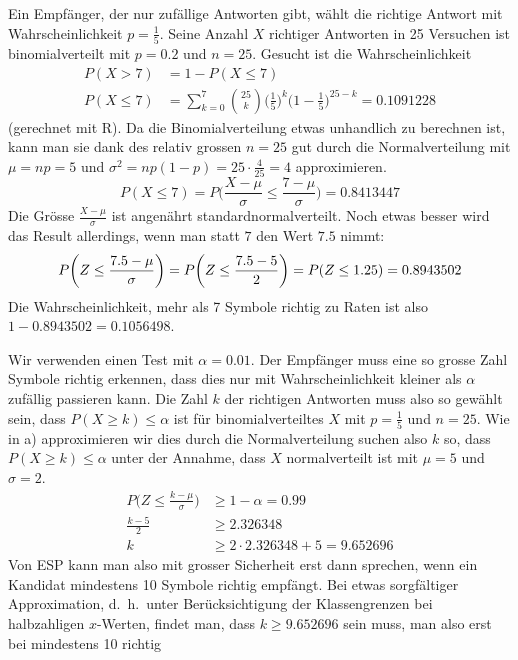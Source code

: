 \begin{loesung}
\begin{teilaufgaben}
\item Ein Empfänger, der nur zufällige Antworten gibt, wählt
die richtige Antwort mit Wahrscheinlichkeit $p=\frac15$.
Seine Anzahl $X$ richtiger Antworten in 25 Versuchen ist binomialverteilt mit
$p=0.2$ und $n=25$. Gesucht ist die Wahrscheinlichkeit
\begin{align*}
P(X > 7)&= 1 - P(X\le 7)\\
P(X\le 7)&=\sum_{k=0}^7\binom{25}{k}
\biggl(\frac15\biggr)^k
\biggl(1-\frac15\biggr)^{25-k}
 = 0.1091228
\end{align*}
(gerechnet mit R).
Da die Binomialverteilung etwas unhandlich zu berechnen ist, kann man sie
dank des relativ grossen $n=25$ gut durch die Normalverteilung
mit $\mu=np=5$ und $\sigma^2=np(1-p)=25\cdot\frac{4}{25}=4$
approximieren.
\[
P(X\le 7)=P\biggl(\frac{X-\mu}{\sigma}\le \frac{7-\mu}{\sigma}\biggr)
=
0.8413447
\]
Die Grösse $\frac{X-\mu}{\sigma}$ ist angenährt standardnormalverteilt.
Noch etwas besser wird das Result allerdings, wenn man statt $7$ den
Wert $7.5$ nimmt:
\[
P\biggl(Z\le\frac{7.5-\mu}{\sigma}\biggr)
=
P\biggl(Z\le \frac{7.5-5}{2}\biggr)
=
P(Z\le 1.25)=0.8943502\\
\]
Die Wahrscheinlichkeit, mehr als 7 Symbole richtig zu Raten ist
also $1-0.8943502= 0.1056498$.
\item
Wir verwenden einen Test mit $\alpha=0.01$.
Der Empfänger muss eine so grosse Zahl Symbole richtig erkennen,
dass dies nur mit Wahrscheinlichkeit kleiner als $\alpha$ zufällig
passieren kann.
Die Zahl $k$ der richtigen Antworten muss also so gewählt sein,
dass $P(X\ge k) \le \alpha$ ist für binomialverteiltes $X$ mit $p=\frac15$
und $n=25$. Wie in a) approximieren wir dies durch die Normalverteilung
suchen also $k$ so, dass $P(X\ge k)\le\alpha$ unter der Annahme, dass
$X$ normalverteilt ist mit $\mu=5$ und $\sigma=2$.
\begin{align*}
P\biggl(Z\le \frac{k - \mu}{\sigma}\biggr)&\ge 1-\alpha=0.99\\
\frac{k-5}2&\ge 2.326348\\
k&\ge 2\cdot 2.326348 + 5=9.652696
\end{align*}
Von ESP kann man also mit grosser Sicherheit erst dann sprechen, wenn
ein Kandidat mindestens 10 Symbole richtig empfängt.
Bei etwas sorgfältiger Approximation, d.~h.~unter Berücksichtigung
der Klassengrenzen bei halbzahligen $x$-Werten, findet man, dass
$k\ge 9.652696$ sein muss, man also erst bei mindestens 10 richtig

\end{teilaufgaben}
\end{loesung}
